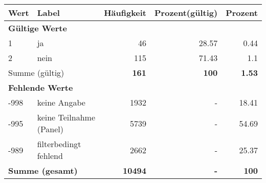      \begin{longtable}{lXrrr}
     \toprule
     \textbf{Wert} & \textbf{Label} & \textbf{Häufigkeit} & \textbf{Prozent(gültig)} & \textbf{Prozent} \\
     \endhead
     \midrule
     \multicolumn{5}{l}{\textbf{Gültige Werte}}\\

     1 &
     \multicolumn{1}{X}{ ja   } &


       \num{46} &
       \num[round-mode=places,round-precision=2]{28,57} &
         \num[round-mode=places,round-precision=2]{0,44} \\

     2 &
     \multicolumn{1}{X}{ nein   } &


       \num{115} &
       \num[round-mode=places,round-precision=2]{71,43} &
         \num[round-mode=places,round-precision=2]{1,1} \\
     \midrule
     \multicolumn{2}{l}{Summe (gültig)} &
       \textbf{\num{161}} &
     \textbf{100} &
       \textbf{\num[round-mode=places,round-precision=2]{1,53}} \\
     \multicolumn{5}{l}{\textbf{Fehlende Werte}}\\
       -998 &
       keine Angabe &
         \num{1932} &
        - &
         \num[round-mode=places,round-precision=2]{18,41} \\
       -995 &
       keine Teilnahme (Panel) &
         \num{5739} &
        - &
         \num[round-mode=places,round-precision=2]{54,69} \\
       -989 &
       filterbedingt fehlend &
         \num{2662} &
        - &
         \num[round-mode=places,round-precision=2]{25,37} \\
     \midrule
     \multicolumn{2}{l}{\textbf{Summe (gesamt)}} &
          \textbf{\num{10494}} &
        \textbf{-} &
        \textbf{100} \\
     \bottomrule
     \end{longtable}
     
